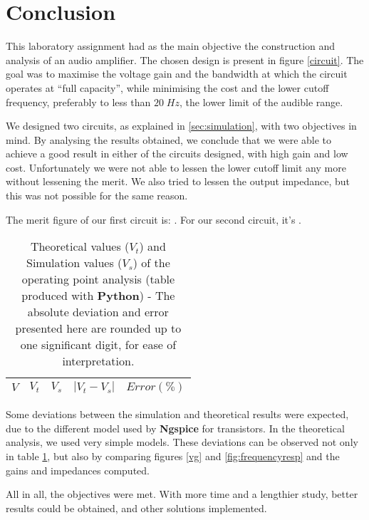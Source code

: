 \section{Conclusion}
\label{sec:conclusion}

This laboratory assignment had as the main objective the construction and analysis of an audio amplifier. The chosen design is present in figure \ref{circuit}. The goal was to maximise the voltage gain and the bandwidth at which the circuit operates at ``full capacity'', while minimising the cost and the lower cutoff frequency, preferably to less than $20\;Hz$, the lower limit of the audible range.

We designed two circuits, as explained in \ref{sec:simulation}, with two objectives in mind. By analysing the results obtained, we conclude that we were able to achieve a good result in either of the circuits designed, with high gain and low cost. Unfortunately we were not able to lessen the lower cutoff limit any more without lessening the merit. We also tried to lessen the output impedance, but this was not possible for the same reason.

The merit figure of our first circuit is: . For our second circuit, it's .


\begin{table}[H]
  \centering
  \begin{tabular}{|c|c|c|c|c|}
    \hline
        $V$ & $V_t$ & $V_s$ & $|V_t-V_s|$ & $Error (\%)$ \\
        \hline
        \hline
        
        \hline
  \end{tabular}
  \caption{Theoretical values ($V_t$) and Simulation values ($V_s$) of the operating point analysis (table produced with {\bf Python})  - The absolute deviation and error presented here are rounded up to one significant digit, for ease of interpretation.}
  \label{error1_res}
\end{table}


Some deviations between the simulation and theoretical results were expected, due to the different model used by {\bf Ngspice} for transistors. In the theoretical analysis, we used very simple models. These deviations can be observed not only in table \ref{error1_res}, but also by comparing figures \ref{vg} and \ref{fig:frequencyresp} and the gains and impedances computed.

All in all, the objectives were met. With more time and a lengthier study, better results could be obtained, and other solutions implemented.
